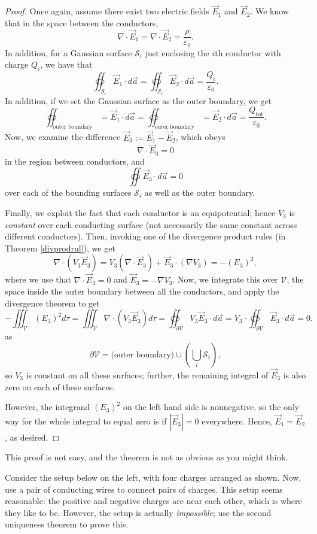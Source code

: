 \begin{proof}
    Once again, assume there exist two electric fields $\vec{E}_1$ and $\vec{E}_2$. We know that in the space between the conductors,
    \[\nabla\cdot \vec{E}_1=\nabla\cdot\vec{E}_2=\frac{\rho}{\varepsilon_0}.\]
    In addition, for a Gaussian surface $\mathcal{S}_i$ just enclosing the $i$th conductor with charge $Q_i$, we have that
    \[\oiint_{\mathcal{S}_i}\vec{E}_1\cdot d\vec{a}=\oiint_{\mathcal{S}_i}\vec{E}_2\cdot d\vec{a}=\frac{Q_i}{\varepsilon_0}.\]
    In addition, if we set the Gaussian surface as the outer boundary, we get
    \[\oiint_{\text{outer boundary}}=\vec{E}_1\cdot d\vec{a}=\oiint_{\text{outer boundary}}=\vec{E}_2\cdot d\vec{a}=\frac{Q_{\text{tot}}}{\varepsilon_0}.\]
    Now, we examine the difference $\vec{E}_3:=\vec{E}_1-\vec{E}_2$, which obeys 
    \[\nabla\cdot \vec{E}_3=0\]
    in the region between conductors, and
    \[\oiint\vec{E}_3\cdot d\vec{a}=0\]
    over each of the bounding surfaces $\mathcal{S}_i$ as well as the outer boundary.
    
    Finally, we exploit the fact that each conductor is an equipotential; hence $V_3$ is \textit{constant} over each conducting surface (not necessarily the same constant across different conductors). Then, invoking one of the divergence product rules (in Theorem \ref{divprodrul}), we get
    \[\nabla\cdot (V_3\vec{E}_3)=V_3(\nabla\cdot \vec{E}_3)+\vec{E}_3\cdot(\nabla V_3)=-(E_3)^2,\]
    where we use that $\nabla\cdot\vec{E}_3=0$ and $\vec{E}_3=-\nabla V_3$. Now, we integrate this over $\mathcal{V}$, the space inside the outer boundary between all the conductors, and apply the divergence theorem to get
    \[-\iiint_{\mathcal{V}}(E_3)^2d\tau=\iiint_{\mathcal{V}}\nabla\cdot(V_3\vec{E}_3)d\tau=\oiint_{\partial\mathcal{V}}V_3\vec{E}_3\cdot d\vec{a}=V_3\cdot\oiint_{\partial\mathcal{V}}\vec{E}_3\cdot d\vec{a}=0.\]
    as 
    \[\partial\mathcal{V}=\text{(outer boundary)}\cup \left(\bigcup_i\mathcal{S}_i\right),\]
    so $V_3$ is constant on all these surfaces; further, the remaining integral of $\vec{E}_3$ is also zero on each of these surfaces.
    
    However, the integrand $(E_3)^2$ on the left hand side is nonnegative, so the only way for the whole integral to equal zero is if $|\vec{E}_3|=0$ everywhere. Hence, $\vec{E}_1=\vec{E}_2$, as desired.
\end{proof}

This proof is not easy, and the theorem is not as obvious as you might think. 

\begin{example}
Consider the setup below on the left, with four charges arranged as shown. Now, use a pair of conducting wires to connect pairs of charges. This setup seems reasonable: the positive and negative charges are near each other, which is where they like to be. However, the setup is actually \textit{impossible}; use the second uniqueness theorem to prove this.
\end{example}

